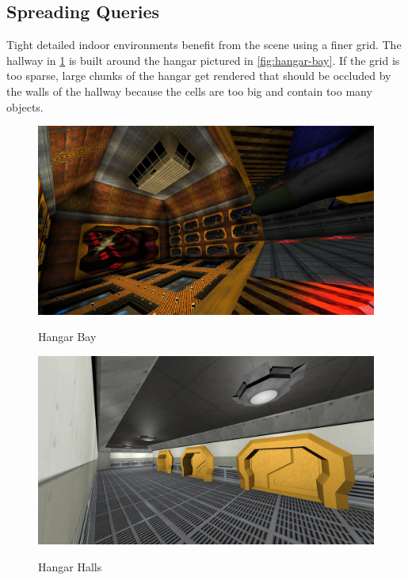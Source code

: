 \documentclass[12pt]{ucthesis}
\newcommand{\captionfonts}{\small\bf\ssp}
\begin{document}
\subsection {Spreading Queries}
\label{spreading-queries}

Tight detailed indoor environments benefit from the scene using a finer grid.
The hallway in \ref{fig:hangar-halls} is built around the hangar pictured in \ref{fig:hangar-bay}.
If the grid is too sparse, large chunks of the hangar get rendered that should be occluded by the walls of the hallway because the cells are too big and contain too many objects.

\begin{figure}
\begin{center}
\includegraphics[width=\textwidth]{Images/Hangar.jpg}
\captionfonts
\caption[Hangar Bay]{Hangar Bay}
\label{fig:hangar-bay}
\includegraphics[width=\textwidth]{Images/HallCorner.jpg}
\captionfonts
\caption[Hangar Halls]{Hangar Halls}
\label{fig:hangar-halls}
\end{center}
\end{figure}
\end{document}
